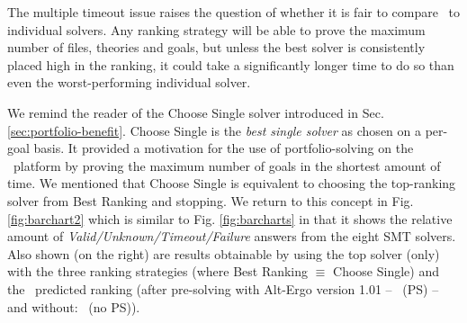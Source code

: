 The multiple timeout issue raises the question of whether it is fair to compare \where~to individual solvers. 
Any ranking strategy will be able to prove the maximum number of files, theories and goals, but unless the best solver is consistently placed high in the ranking, it could take a significantly longer time to do so than even the worst-performing individual solver.   

We remind the reader of the \textsf{Choose Single} solver introduced in Sec. \ref{sec:portfolio-benefit}.
\textsf{Choose Single} is the \textit{best single solver} as chosen on a per-goal basis.
It provided a motivation for the use of portfolio-solving on the \why~platform by proving the maximum number of goals in the shortest amount of time.
We mentioned that \textsf{Choose Single} is equivalent to choosing  the top-ranking solver from \textsf{Best Ranking} and stopping.
We return to this concept in Fig. \ref{fig:barchart2} which is similar to Fig. \ref{fig:barcharts} in that it shows the relative amount of \textit{Valid/Unknown/Timeout/Failure} answers from the eight SMT solvers. 
Also shown (on the right) are results obtainable by using the top solver (only) with the three ranking strategies (where \textsf{Best Ranking} $\equiv$ \textsf{Choose Single}) and the \where~predicted ranking (after pre-solving with Alt-Ergo version 1.01 -- \where~(PS) -- and without: \where~(no PS)).


